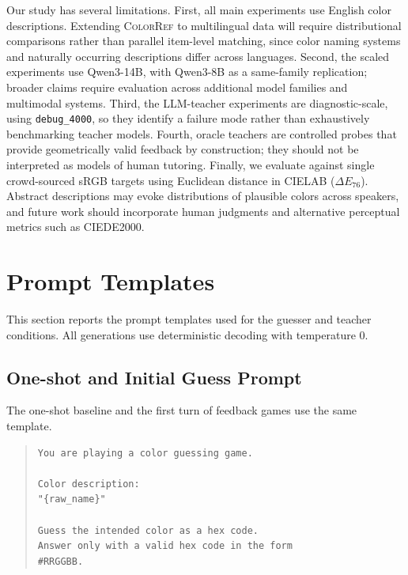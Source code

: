 \documentclass[11pt]{article}
\begin{document}
Our study has several limitations. First, all main experiments use English
color descriptions. Extending \textsc{ColorRef} to multilingual data will
require distributional comparisons rather than parallel item-level matching,
since color naming systems and naturally occurring descriptions differ
across languages. Second, the scaled experiments use Qwen3-14B, with
Qwen3-8B as a same-family replication; broader claims require evaluation
across additional model families and multimodal systems. Third, the
LLM-teacher experiments are diagnostic-scale, using \texttt{debug\_4000}, so
they identify a failure mode rather than exhaustively benchmarking teacher
models. Fourth, oracle teachers are controlled probes that provide
geometrically valid feedback by construction; they should not be interpreted
as models of human tutoring. Finally, we evaluate against single
crowd-sourced sRGB targets using Euclidean distance in CIELAB
($\Delta E_{76}$). Abstract descriptions may evoke distributions of
plausible colors across speakers, and future work should incorporate human
judgments and alternative perceptual metrics such as CIEDE2000.


%


\appendix

\section{Prompt Templates}
\label{sec:appendix-prompts}

This section reports the prompt templates used for the guesser and teacher
conditions. All generations use deterministic decoding with temperature
$0$.

\subsection{One-shot and Initial Guess Prompt}

The one-shot baseline and the first turn of feedback games use the same
template.

\begin{quote}
\small
\begin{verbatim}
You are playing a color guessing game.

Color description:
"{raw_name}"

Guess the intended color as a hex code.
Answer only with a valid hex code in the form 
#RRGGBB.
\end{verbatim}
\end{quote}
\end{document}

